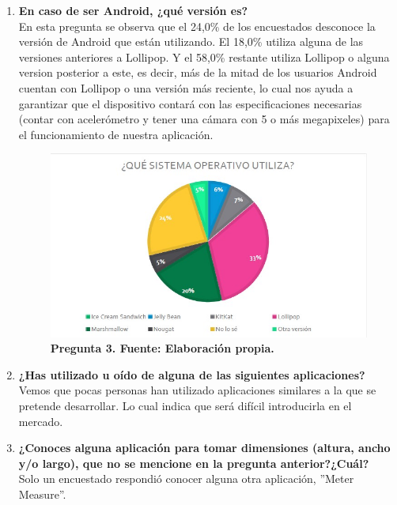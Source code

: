 \begin{enumerate}
        \item \textbf{En caso de ser Android, ¿qué versión es?}\\	
        En esta pregunta se observa que el 24,0\% de los encuestados desconoce la versión de Android que están utilizando. El 18,0\% utiliza alguna de las versiones anteriores a Lollipop. Y el 58,0\% restante utiliza Lollipop o alguna version posterior a este, es decir, más de la mitad de los usuarios Android cuentan con Lollipop o una versión más reciente, lo cual nos ayuda a garantizar que el dispositivo contará con las especificaciones necesarias (contar con acelerómetro y tener una cámara con 5 o más megapixeles)  para el funcionamiento de nuestra aplicación.
        \begin{figure}[h!]
	        \centering	            
	        \includegraphics[width=15.5cm]{IMG/Graficas/3}
	            \caption{ \textbf{Pregunta 3. Fuente: Elaboración propia.}}
	            \label{fig:edomercado3}
	\end{figure}
	
        \item \textbf{¿Has utilizado u oído de alguna de las siguientes aplicaciones?}\\
        Vemos que pocas personas han utilizado aplicaciones similares a la que se pretende desarrollar. Lo cual indica que será difícil introducirla en el mercado.
        
        \item \textbf{¿Conoces alguna aplicación para tomar dimensiones (altura, ancho y/o largo), que no se mencione en la pregunta anterior?¿Cuál?}\\
	    Solo un encuestado respondió conocer alguna otra aplicación, ''Meter Measure''.
	    \newpage
	    

\end{enumerate}
